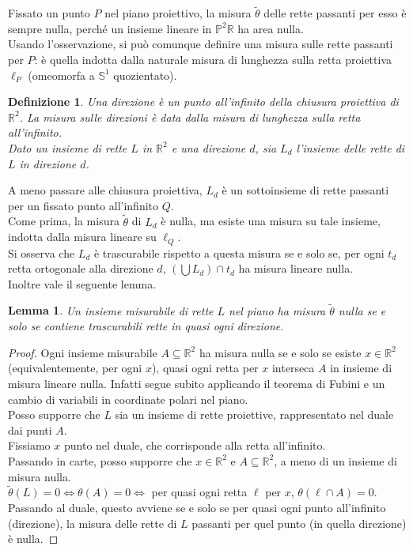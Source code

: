 \documentclass[a4paper, twoside,openright]{article}
\newcommand{\LRa}{\Leftrightarrow}
\newcommand{\R}{\mathbb{R}}
\renewcommand{\P}{\mathbb{P}}
\renewcommand{\S}{\mathbb{S}}
\newcommand{\<}{\langle}
\renewcommand{\>}{\rangle}
\newtheorem{lemma}[teo]{Lemma}
\newtheorem{defin}[teo]{Definizione}
\begin{document}
Fissato un punto $P$ nel piano proiettivo, la misura $\tilde \theta$ delle rette passanti per esso è sempre nulla, perché un insieme lineare in $\P^2 \R$ ha area nulla.\\
Usando l'osservazione, si può comunque definire una misura sulle rette passanti per $P$: è quella indotta dalla naturale misura di lunghezza sulla retta proiettiva $\ell_P$ (omeomorfa a $\S^1$ quozientato).

\begin{defin}
Una direzione è un punto all'infinito della chiusura proiettiva di $\R^2$. La misura sulle direzioni è data dalla misura di lunghezza sulla retta all'infinito.\\
Dato un insieme di rette $L$ in $\R^2$ e una direzione $d$, sia $L_{d}$ l'insieme delle rette di $L$ in direzione $d$.
\end{defin}

A meno passare alle chiusura proiettiva, $L_{d}$ è un sottoinsieme di rette passanti per un fissato punto all'infinito $Q$.\\
Come prima, la misura $\tilde \theta$ di $L_d$ è nulla, ma esiste una misura su tale insieme, indotta dalla misura lineare su $\ell_Q$.\\
Si osserva che $L_d$ è trascurabile rispetto a questa misura se e solo se, per ogni $t_d$ retta ortogonale alla direzione $d$, $ (\bigcup L_d) \cap t_d$ ha misura lineare nulla.\\
Inoltre vale il seguente lemma.

\begin{lemma}
	Un insieme misurabile di rette $L$ nel piano ha misura $\tilde \theta$ nulla se e solo se contiene trascurabili rette in quasi ogni direzione. 
\end{lemma}

\begin{proof}
	Ogni insieme misurabile $A \subseteq \R^2$ ha misura nulla se e solo se esiste $x \in \R^2$ (equivalentemente, per ogni $x$), quasi ogni retta per $x$ interseca $A$ in insieme di misura lineare nulla. Infatti segue subito applicando il teorema di Fubini e un cambio di variabili in coordinate polari nel piano.\\
	Posso supporre che $L$ sia un insieme di rette proiettive, rappresentato nel duale dai punti $A$.\\
	Fissiamo $x$ punto nel duale, che corrisponde alla retta all'infinito.\\
	Passando in carte, posso supporre che $x \in \R^2$ e $A\subseteq \R^2$, a meno di un insieme di misura nulla.\\
	$\tilde \theta (L)=0 \LRa \theta(A)=0 \LRa$ per quasi ogni retta $\ell$ per $x$, $\theta(\ell \cap A)=0$.\\
	Passando al duale, questo avviene se e solo se per quasi ogni punto all'infinito (direzione), la misura delle rette di $L$ passanti per quel punto (in quella direzione) è nulla.
\end{proof}	
\end{document}
